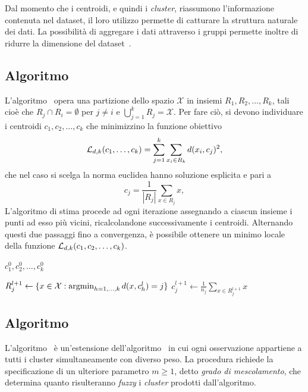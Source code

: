 \documentclass[runningheads]{llncs}
\begin{document}
Dal momento che i centroidi, e quindi i \textit{cluster}, riassumono l'informazione contenuta nel dataset, il loro utilizzo permette di catturare la struttura naturale dei dati.
La possibilità di aggregare i dati attraverso i gruppi permette inoltre di ridurre la dimensione del dataset~\cite{tan2005}.

\subsection*{Algoritmo \km}
L'algoritmo \km\ opera una partizione dello spazio $\mathcal{X}$ in insiemi $R_1, R_2, \ldots, R_k$, tali cioè che $R_j \cap R_i = \emptyset $ per $j \neq i$ e $ \bigcup_{j = 1}^k R_j = \mathcal{X} $.
Per fare ciò, si devono individuare i centroidi $c_1, c_2, \ldots, c_k$ che minimizzino la funzione obiettivo
\[
     \mathcal{L}_{d,k}(c_1, \ldots, c_k) = \sum_{j=1}^{k} \sum_{x_i \in R_k} d(x_i, c_j)^2 ,
\]
che nel caso si scelga la norma euclidea hanno soluzione esplicita e pari a
\[
    c_j = \frac{1}{|R_j|}\sum_{x \in R_j} x,
\]
L'algoritmo di stima procede ad ogni iterazione assegnando a ciascun insieme i punti ad esso più vicini, ricalcolandone successivamente i centroidi. Alternando questi due passaggi fino a convergenza, è possibile ottenere un minimo locale della funzione $ \mathcal{L}_{d,k}(c_1, c_2, \ldots, c_k)$.

{\centering
\begin{algorithm}[H]
\caption{\km}
\begin{algorithmic}[1]
    \Require $c^{0}_1, c^{0}_2, \ldots, c^{0}_k$
    \item[]
        \State $R^{l+1}_j \leftarrow \{x \in \mathcal{X} : \operatorname*{argmin}_{h = 1, \ldots, k} d(x , c^{l}_h) = j \} $
        \EndFor
        \State $c_j^{l+1} \leftarrow \frac{1}{n_j}\sum_{x \in R_j^{l+1}} x $
        \EndFor
    \EndWhile
\end{algorithmic}
\end{algorithm}
}

\subsection*{Algoritmo \fcm}
L'algoritmo \fcm\ è un'estensione dell'algoritmo \km\ in cui ogni osservazione appartiene a tutti i cluster simultaneamente con diverso peso.
La procedura richiede la specificazione di un ulteriore parametro $m \geqslant 1$, detto \textit{grado di mescolamento}, che determina quanto risulteranno \emph{fuzzy} i \textit{cluster} prodotti dall'algoritmo.
\end{document}
